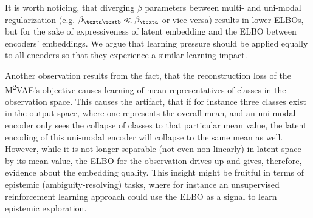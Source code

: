 %
%

It is worth noticing, that diverging $\beta$ parameters between multi- and uni-modal regularization (e.g. $\beta_{\texta\textb} \ll \beta_{\texta}$ or vice versa) results in lower ELBOs, but for the sake of expressiveness of latent embedding and the ELBO between encoders' embeddings.
%
We argue that learning pressure should be applied equally to all encoders so that they experience a similar learning impact.

Another observation results from the fact, that the reconstruction loss of the M\textsuperscript{2}VAE's objective causes learning of mean representatives of classes in the observation space.
This causes the artifact, that if for instance three classes exist in the output space, where one represents the overall mean, and an uni-modal encoder only sees the collapse of classes to that particular mean value, the latent encoding of this uni-modal encoder will collapse to the same mean as well.
%
However, while it is not longer separable (not even non-linearly) in latent space by its mean value, the ELBO for the observation drives up and gives, therefore, evidence about the embedding quality.
%
This insight might be fruitful in terms of epistemic (ambiguity-resolving) tasks, where for instance an unsupervised reinforcement learning approach could use the ELBO as a signal to learn epistemic exploration.
%
%

